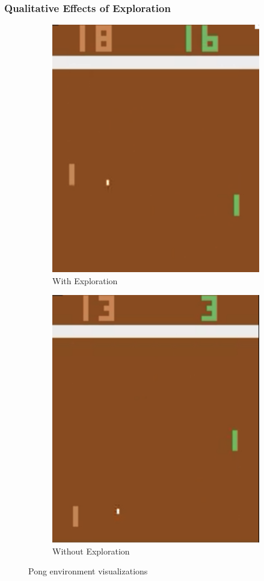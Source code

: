 \documentclass{article}
\begin{document}
\subsubsection{Qualitative Effects of Exploration}

\begin{figure}
\centering
\begin{subfigure}{.5\textwidth}
  \centering
  \includegraphics[width=.7\linewidth]{figures/pong}
  \caption{With Exploration}
\end{subfigure}%
\begin{subfigure}{.5\textwidth}
  \centering
  \includegraphics[width=.7\linewidth]{figures/pong_no_exp}
  \caption{Without Exploration}
\end{subfigure}
\caption{Pong environment visualizations}
\label{fig:pong}
\end{figure}
\end{document}
